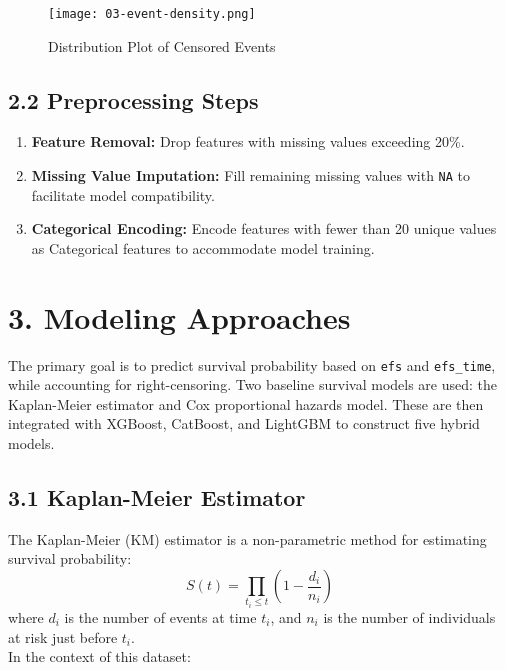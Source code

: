 \documentclass[11pt]{article}
\begin{document}
\begin{figure}
    \centering
    \texttt{[image: 03-event-density.png]}
    \caption{Distribution Plot of Censored Events}
    \label{fig:enter-label}
\end{figure}

\subsection*{2.2 Preprocessing Steps}
\begin{enumerate}
  \item \textbf{Feature Removal:} Drop features with missing values exceeding 20\%.
  \item \textbf{Missing Value Imputation:} Fill remaining missing values with \texttt{NA} to facilitate model compatibility.
  \item \textbf{Categorical Encoding:} Encode features with fewer than 20 unique values as Categorical features to accommodate model training.
\end{enumerate}

\section*{3. Modeling Approaches}
The primary goal is to predict survival probability based on \texttt{efs} and \texttt{efs\_time}, while accounting for right-censoring. Two baseline survival models are used: the Kaplan-Meier estimator and Cox proportional hazards model. These are then integrated with XGBoost, CatBoost, and LightGBM to construct five hybrid models.

\subsection*{3.1 Kaplan-Meier Estimator}
The Kaplan-Meier (KM) estimator is a non-parametric method for estimating survival probability:
\[
S(t) = \prod_{t_i \leq t} \left(1 - \frac{d_i}{n_i}\right)
\]
where $d_i$ is the number of events at time $t_i$, and $n_i$ is the number of individuals at risk just before $t_i$. \\
\noindent In the context of this dataset:
\end{document}
